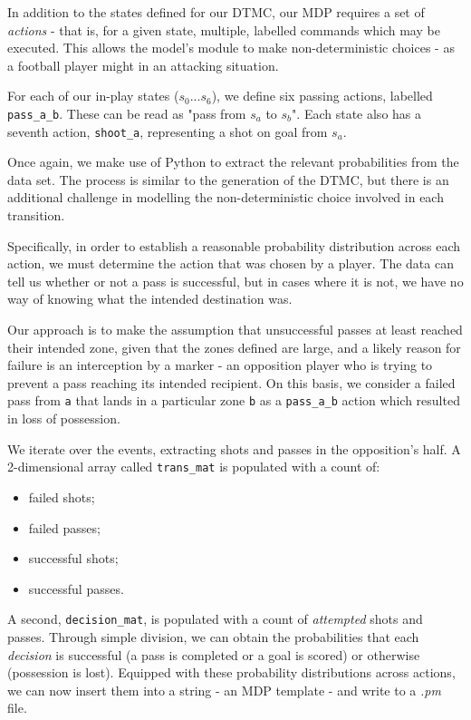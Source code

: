 \documentclass{l4proj}
\begin{document}
In addition to the states defined for our DTMC, our MDP requires a set of \textit{actions} - that is, for a given state, multiple, labelled commands which may be executed. This allows the model's module to make non-deterministic choices - as a football player might in an attacking situation.

For each of our in-play states ($s_0 ... s_6$), we define six passing actions, labelled \texttt{pass\_a\_b}. These can be read as "pass from  $s_a$ to $s_b$". Each state also has a seventh action, \texttt{shoot\_a}, representing a shot on goal from $s_a$.

Once again, we make use of Python to extract the relevant probabilities from the data set. The process is similar to the generation of the DTMC, but there is an additional challenge in modelling the non-deterministic choice involved in each transition.

Specifically, in order to establish a reasonable probability distribution across each action, we must determine the action that was chosen by a player. The data can tell us whether or not a pass is successful, but in cases where it is not, we have no way of knowing what the intended destination was.

Our approach is to make the assumption that unsuccessful passes at least reached their intended zone, given that the zones defined are large, and a likely reason for failure is an interception by a marker - an opposition player who is trying to prevent a pass reaching its intended recipient. On this basis, we consider a failed pass from \texttt{a} that lands in a particular zone \texttt{b} as a \texttt{pass\_a\_b} action which resulted in loss of possession. 

We iterate over the events, extracting shots and passes in the opposition's half. A 2-dimensional array called \texttt{trans\_mat} is populated with a count of:

\begin{itemize}
    
    \item failed shots;
    \item failed passes;
    \item successful shots;
    \item successful passes.

\end{itemize}

A second, \texttt{decision\_mat}, is populated with a count of \textit{attempted} shots and passes. Through simple division, we can obtain the probabilities that each \textit{decision} is successful (a pass is completed or a goal is scored) or otherwise (possession is lost). Equipped with these probability distributions across actions, we can now insert them into a string - an MDP template - and write to a \textit{.pm} file.
\end{document}
